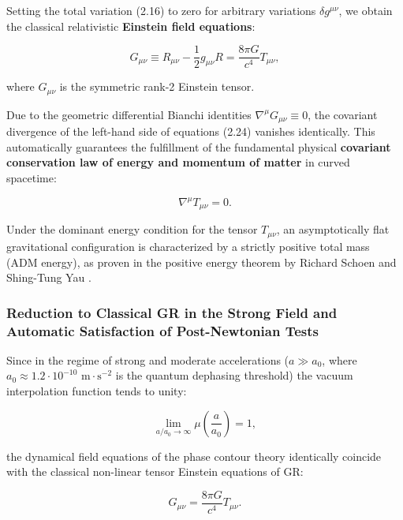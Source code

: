 Setting the total variation (2.16) to zero for arbitrary variations $\delta g^{\mu\nu}$, we obtain the classical relativistic \textbf{Einstein field equations}:

\begin{equation}\label{eq:2.24}\tag{2.24}
G_{\mu\nu} \equiv R_{\mu\nu} - \frac{1}{2} g_{\mu\nu} R = \frac{8\pi G}{c^4} T_{\mu\nu},
\end{equation}

where $G_{\mu\nu}$ is the symmetric rank-2 Einstein tensor.

Due to the geometric differential Bianchi identities $\nabla^\mu G_{\mu\nu} \equiv 0$, the covariant divergence of the left-hand side of equations (2.24) vanishes identically. This automatically guarantees the fulfillment of the fundamental physical \textbf{covariant conservation law of energy and momentum of matter} in curved spacetime:

\begin{equation}\label{eq:2.25}\tag{2.25}
\nabla^\mu T_{\mu\nu} = 0.
\end{equation}

Under the dominant energy condition for the tensor $T_{\mu\nu}$, an asymptotically flat gravitational configuration is characterized by a strictly positive total mass (ADM energy), as proven in the positive energy theorem by Richard Schoen and Shing-Tung Yau \cite{ref15}.

\subsubsection{Reduction to Classical GR in the Strong Field and Automatic Satisfaction of Post-Newtonian Tests}\label{sec:2.2.1}

Since in the regime of strong and moderate accelerations ($a \gg a_0$, where $a_0 \approx 1.2 \cdot 10^{-10}\text{ m}\cdot\text{s}^{-2}$ is the quantum dephasing threshold) the vacuum interpolation function tends to unity:

\begin{equation*}
\lim_{a/a_0 \to \infty} \mu\left(\frac{a}{a_0}\right) = 1,
\end{equation*}

the dynamical field equations of the phase contour theory identically coincide with the classical non-linear tensor Einstein equations of GR:

\begin{equation*}
G_{\mu\nu} = \frac{8\pi G}{c^4} T_{\mu\nu}.
\end{equation*}

